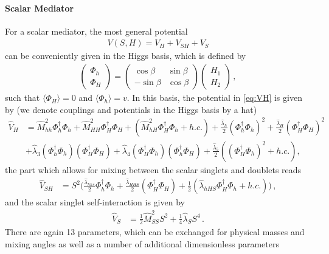 \paragraph{Scalar Mediator}
For a scalar mediator, the most general potential 
\begin{align}
V(S, H)= V_H + V_{SH} +V_S
\end{align}
can be conveniently given in the Higgs basis, which is defined by  
\begin{align}
\begin{pmatrix}
\Phi_h\\
\Phi_H
\end{pmatrix} =\begin{pmatrix}
\cos\beta & \sin \beta \\
-\sin\beta & \cos \beta 
\end{pmatrix}
\begin{pmatrix}
H_1\\
H_2
\end{pmatrix}\,,
\end{align}
such that  $\langle \Phi_H \rangle =0$ and $\langle \Phi_h\rangle=v$. In this basis, the potential in \eqref{eq:VH} is given by (we denote couplings and potentials in the Higgs basis by a hat)
\begin{align}
\hat{V}_{H} &= \hat{M}_{hh}^2 \Phi_h^\dagger \Phi_h + \hat{M}_{HH}^2 \Phi_H^\dagger \Phi_H +  (\hat{M}_{hH}^2 \Phi_H^\dagger \Phi_h + h.c.) + \frac{\hat{\lambda}_h}{2} (\Phi_h^\dagger \Phi_h)^2 + \frac{\hat{\lambda}_H}{2} (\Phi_H^\dagger \Phi_H)^2 \nonumber \\
&+\hat{\lambda}_3 (\Phi_h^\dagger \Phi_h)(\Phi_H^\dagger \Phi_H) + \hat{\lambda}_4 (\Phi_H^\dagger \Phi_h)(\Phi_h^\dagger \Phi_H)  
+ \frac{\hat{\lambda}_5}{2} \left( (\Phi_H^\dagger \Phi_h)^2 + h.c.\right),
\end{align}
the part which allows for mixing between the scalar singlets and doublets reads
\begin{align}
\hat{V}_{SH}&=
  S^2 \bigg( \frac{\hat{\lambda}_{hhs}}{2} \Phi_h^\dagger \Phi_h +  \frac{\hat{\lambda}_{HHS}}{2}(\Phi_H^\dagger \Phi_H)+\frac{1}{2}(\hat{\lambda}_{hHS} \Phi_H^\dagger \Phi_h + h.c.)\bigg) \,,
\end{align}
and the scalar singlet self-interaction is given by 
\begin{align}
\hat{V}_S &= \frac{1}{2} \hat{M}_{SS}^2 S^2 + \frac{1}{4} \hat{\lambda}_S S^4\,.
\end{align}
There are again 13 parameters, which can be exchanged for physical masses and mixing angles as well as a number of additional dimensionless parameters
